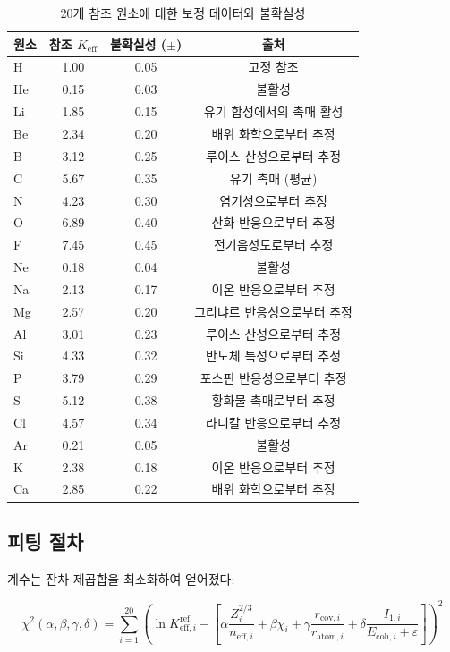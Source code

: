 \documentclass[12pt,a4paper]{article}
\newcommand{\Keff}{K_{\mathrm{eff}}}
\begin{document}
	\begin{table}[htbp]
		\centering
		\caption{20개 참조 원소에 대한 보정 데이터와 불확실성}
		\label{tab:calibration}
		\begin{tabular}{lccc}
			\toprule
			원소 & 참조 $\Keff$ & 불확실성 ($\pm$) & 출처 \\
			\midrule
			H & 1.00 & 0.05 & 고정 참조 \\
			He & 0.15 & 0.03 & 불활성 \\
			Li & 1.85 & 0.15 & 유기 합성에서의 촉매 활성 \\
			Be & 2.34 & 0.20 & 배위 화학으로부터 추정 \\
			B & 3.12 & 0.25 & 루이스 산성으로부터 추정 \\
			C & 5.67 & 0.35 & 유기 촉매 (평균) \\
			N & 4.23 & 0.30 & 염기성으로부터 추정 \\
			O & 6.89 & 0.40 & 산화 반응으로부터 추정 \\
			F & 7.45 & 0.45 & 전기음성도로부터 추정 \\
			Ne & 0.18 & 0.04 & 불활성 \\
			Na & 2.13 & 0.17 & 이온 반응으로부터 추정 \\
			Mg & 2.57 & 0.20 & 그리냐르 반응성으로부터 추정 \\
			Al & 3.01 & 0.23 & 루이스 산성으로부터 추정 \\
			Si & 4.33 & 0.32 & 반도체 특성으로부터 추정 \\
			P & 3.79 & 0.29 & 포스핀 반응성으로부터 추정 \\
			S & 5.12 & 0.38 & 황화물 촉매로부터 추정 \\
			Cl & 4.57 & 0.34 & 라디칼 반응으로부터 추정 \\
			Ar & 0.21 & 0.05 & 불활성 \\
			K & 2.38 & 0.18 & 이온 반응으로부터 추정 \\
			Ca & 2.85 & 0.22 & 배위 화학으로부터 추정 \\
			\bottomrule
		\end{tabular}
	\end{table}
	
	\subsection{피팅 절차}
	
	계수는 잔차 제곱합을 최소화하여 얻어졌다:
	
	\begin{equation}
		\chi^2(\alpha,\beta,\gamma,\delta) = \sum_{i=1}^{20} \left( \ln K_{\mathrm{eff},i}^{\text{ref}} - \left[ \alpha \frac{Z_i^{2/3}}{n_{\text{eff},i}} + \beta \chi_i + \gamma \frac{r_{\text{cov},i}}{r_{\text{atom},i}} + \delta \frac{I_{1,i}}{E_{\text{coh},i} + \varepsilon} \right] \right)^2
		\label{eq:chi2}
	\end{equation}
	
\end{document}
